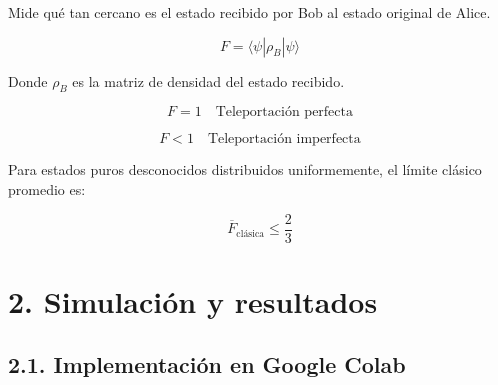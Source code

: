 \documentclass{afitdefense}
\begin{document}
\begin{Center}

\begin{minipage}[c]{0.47\textwidth}
\centering
\small

Mide qué tan cercano es el
estado recibido por Bob al
estado original de Alice.
\vspace{-0.2cm}


\[
\boxed{
F=\langle\psi|\rho_B|\psi\rangle
}
\]

\vspace{0.2cm}

Donde $\rho_B$ es la matriz de
densidad del estado recibido.

\end{minipage}
\hfill
\begin{minipage}[c]{0.47\textwidth}
\centering
\small

\[
F=1
\quad\text{Teleportación perfecta}
\]

\vspace{-0.5cm}

\[
F<1
\quad\text{Teleportación imperfecta}
\]

Para estados puros desconocidos
distribuidos uniformemente,
el límite clásico promedio es:

\[
\boxed{\overline{F}_{\mathrm{clásica}}
\leq\frac{2}{3}}
\]

\end{minipage}

\end{Center}

\chapter{2. Simulación y resultados}

\section{2.1. Implementación en Google Colab}
\end{document}
